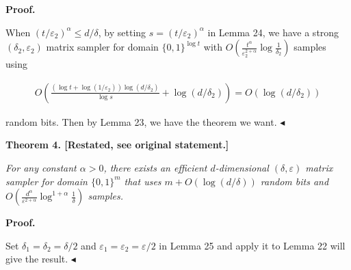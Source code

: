 \documentclass[10pt,a4paper]{article}
\begin{document}



\par\medskip\noindent\textbf{Proof.}\par




When $(t/\varepsilon_{2})^{\alpha}\leq d/\delta$, by setting $s=(t/\varepsilon_{2})^{\alpha}$ in Lemma 24, we have a strong $(\delta_{2},\varepsilon_{2})$ matrix sampler for domain $\{0,1\}^{\log t}$ with $O(\frac{{t}^{\alpha}}{\varepsilon_{2}^{2+\alpha}}\log\frac{1}{\delta_{2}})$ samples using\par


\[\begin{gathered}
O\left(\frac{(\log t+\log(1/\varepsilon_{2}))\log(d/\delta_{2})}{\log s}+\log(d/\delta_{2})\right)=O(\log(d/\delta_{2}))
\end{gathered}\]


random bits. Then by Lemma 23, we have the theorem we want.
$\blacktriangleleft$\par






\par\medskip\noindent\textbf{
\textbf{Theorem 4}\textbf{.}
[Restated, see original statement.]}\par



\emph{For any constant $\alpha>0$, there exists an efficient $d$-dimensional $(\delta,\varepsilon)$ matrix sampler for domain $\{0,1\}^{m}$ that uses $m+O(\log(d/\delta))$ random bits and $O(\frac{d^{\alpha}}{\varepsilon^{2+\alpha}}\log^{1+\alpha}\frac{1}{\delta})$ samples.}\par








\par\medskip\noindent\textbf{Proof.}\par




Set $\delta_{1}=\delta_{2}=\delta/2$ and $\varepsilon_{1}=\varepsilon_{2}=\varepsilon/2$ in Lemma 25 and apply it to Lemma 22 will give the result.
$\blacktriangleleft$\par
\end{document}
